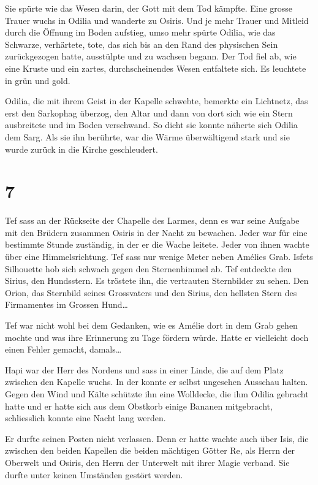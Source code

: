 \documentclass[11pt,titlepage,a5paper]{book}
\begin{document}
Sie spürte wie das Wesen darin, der Gott mit dem Tod kämpfte. Eine grosse Trauer wuchs in Odilia und wanderte zu Osiris. Und je mehr Trauer und Mitleid durch die Öffnung im Boden aufstieg, umso mehr spürte Odilia, wie das Schwarze, verhärtete, tote, das sich bis an den Rand des physischen Sein zurückgezogen hatte, ausstülpte und zu wachsen begann. Der Tod fiel ab, wie eine Kruste und ein zartes, durchscheinendes Wesen entfaltete sich. Es leuchtete in grün und gold.

Odilia, die mit ihrem Geist in der Kapelle schwebte, bemerkte ein Lichtnetz, das erst den Sarkophag überzog, den Altar und dann von dort sich wie ein Stern ausbreitete und im Boden verschwand. So dicht sie konnte näherte sich Odilia dem Sarg.  Als sie ihn berührte, war die Wärme überwältigend stark und sie wurde zurück in die Kirche geschleudert.

\section*{7}

Tef sass an der Rückseite der Chapelle des Larmes, denn es war seine Aufgabe mit den Brüdern zusammen Osiris in der Nacht zu bewachen. Jeder war für eine bestimmte Stunde zuständig, in der er die Wache leitete. Jeder von ihnen wachte über eine Himmelsrichtung. Tef sass nur wenige Meter neben Amélies Grab. Isfets Silhouette hob sich schwach gegen den Sternenhimmel ab. Tef entdeckte den Sirius, den Hundsstern. Es tröstete ihn, die vertrauten Sternbilder zu sehen. Den Orion, das Sternbild seines Grossvaters und den Sirius, den hellsten Stern des Firmamentes im Grossen Hund\dots

Tef war nicht wohl bei dem Gedanken, wie es Amélie dort in dem Grab gehen mochte und was ihre Erinnerung zu Tage fördern würde. Hatte er vielleicht doch einen Fehler gemacht, damals\dots 

Hapi war der Herr des Nordens und sass in einer Linde, die auf dem Platz zwischen den Kapelle wuchs. In der konnte er selbst ungesehen Ausschau halten. Gegen den Wind und Kälte schützte ihn eine Wolldecke, die ihm Odilia gebracht hatte und er hatte sich aus dem Obstkorb einige Bananen mitgebracht, schliesslich konnte eine Nacht lang werden.

Er durfte seinen Posten nicht verlassen. Denn er hatte wachte auch über Isis, die zwischen den beiden Kapellen die beiden mächtigen Götter Re, als Herrn der Oberwelt und Osiris, den Herrn der Unterwelt mit ihrer Magie verband. Sie durfte unter keinen Umständen gestört werden.
\end{document}
